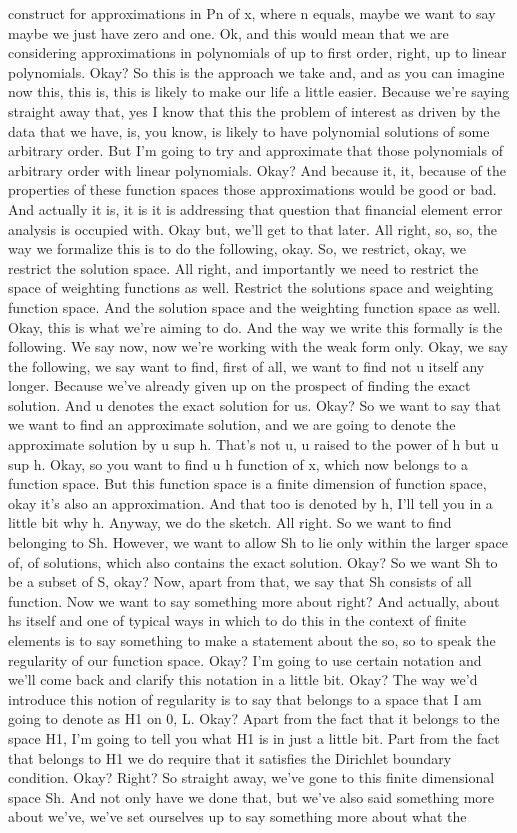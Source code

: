 \documentclass[10pt]{article}
\begin{document}
construct for approximations in Pn of x, where n equals, maybe we want to say maybe we just have zero and one. Ok, and this would mean that we are considering approximations in polynomials of up to first order, right, up to linear polynomials. Okay? So this is the approach we take and, and as you can imagine now this, this is, this is likely to make our life a little easier. Because we're saying straight away that, yes I know that this the problem of interest as driven by the data that we have, is, you know, is likely to have polynomial solutions of some arbitrary order. But I'm going to try and approximate that those polynomials of arbitrary order with linear polynomials. Okay? And because it, it, because of the properties of these function spaces those approximations would be good or bad. And actually it is, it is it is addressing that question that financial element error analysis is occupied with. Okay but, we'll get to that later. All right, so, so, the way we formalize this is to do the following, okay. So, we restrict, okay, we restrict the solution space. All right, and importantly we need to restrict the space of weighting functions as well. Restrict the solutions space and weighting function space. And the solution space and the weighting function space as well. Okay, this is what we're aiming to do. And the way we write this formally is the following. We say now, now we're working with the weak form only. Okay, we say the following, we say want to find, first of all, we want to find not u itself any longer. Because we've already given up on the prospect of finding the exact solution. And u denotes the exact solution for us. Okay? So we want to say that we want to find an approximate solution, and we are going to denote the approximate solution by u sup h. That's not u, u raised to the power of h but u sup h. Okay, so you want to find u h function of x, which now belongs to a function space. But this function space is a finite dimension of function space, okay it's also an approximation. And that too is denoted by h, I'll tell you in a little bit why h. Anyway, we do the sketch. All right. So we want to find belonging to Sh. However, we want to allow Sh to lie only within the larger space of, of solutions, which also contains the exact solution. Okay? So we want Sh to be a subset of S, okay? Now, apart from that, we say that Sh consists of all function. Now we want to say something more about right? And actually, about hs itself and one of typical ways in which to do this in the context of finite elements is to say something to make a statement about the so, so to speak the regularity of our function space. Okay? I'm going to use certain notation and we'll come back and clarify this notation in a little bit. Okay? The way we'd introduce this notion of regularity is to say that belongs to a space that I am going to denote as H1 on 0, L. Okay? Apart from the fact that it belongs to the space H1, I'm going to tell you what H1 is in just a little bit. Part from the fact that belongs to H1 we do require that it satisfies the Dirichlet boundary condition. Okay? Right? So straight away, we've gone to this finite dimensional space Sh. And not only have we done that, but we've also said something more about we've, we've set ourselves up to say something more about what the 
\end{document}

